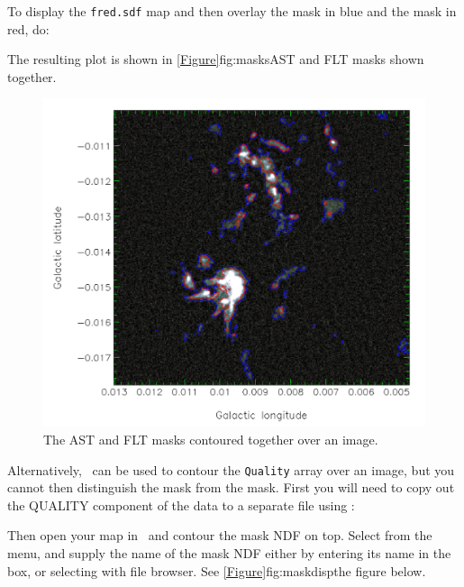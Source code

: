 \begin{terminalv}
\end{terminalv}

To display the \texttt{fred.sdf} map and then overlay the  mask in blue
and the  mask in red, do:

\begin{terminalv}
\end{terminalv}

The resulting plot is shown in \cref{Figure}{fig:masks}{AST and FLT masks
shown together}.

\begin{figure}[t!]
\includegraphics[width=0.6\linewidth]{sc21_masks}
\caption[AST and FLT masks shown together]{The AST and FLT masks contoured
together over an image.}
\label{fig:masks}
\end{figure}

Alternatively, \gaia\ can be used to contour the \texttt{Quality} array
over an image, but you cannot then distinguish the  mask from
the  mask. First you will need to copy out the QUALITY component
of the data to a separate file using :

\begin{terminalv}
\end{terminalv}

Then open your map in \gaia\ and contour the mask NDF on top.
Select  from the 
menu, and supply the name of the mask NDF either by entering its name in
the  box, or selecting with
 file browser. See
\cref{Figure}{fig:maskdisp}{the figure below}.

